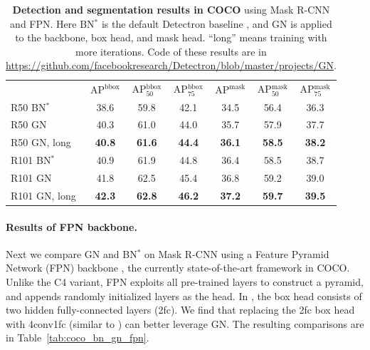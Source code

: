 \documentclass[10pt,twocolumn,letterpaper]{article}
\newcommand{\f}{$^\text{*}$\xspace}
\begin{document}
\renewcommand\arraystretch{1.15}
\setlength{\tabcolsep}{2pt}
\begin{table}[t]
\centering
\small
\begin{tabular}{l|ccc|ccc}
\hline
 \multicolumn{1}{c|}{} & AP$^\text{bbox}$ & AP$^\text{bbox}_\text{50}$ & AP$^\text{bbox}_\text{75}$ & AP$^\text{mask}$ & AP$^\text{mask}_\text{50}$ & AP$^\text{mask}_\text{75}$ \\
\shline
R50 BN\f & 38.6 & 59.8 & 42.1 & 34.5 & 56.4 & 36.3 \\
R50 GN & 40.3 & 61.0 & 44.0 & 35.7 & 57.9 & 37.7 \\
R50 GN, long & \textbf{40.8} & \textbf{61.6} & \textbf{44.4} & \textbf{36.1} & \textbf{58.5} & \textbf{38.2}  \\
\hline
R101 BN\f & 40.9 & 61.9 & 44.8 & 36.4 & 58.5 & 38.7 \\
R101 GN & 41.8 & 62.5 & 45.4 & 36.8 & 59.2 & 39.0 \\
R101 GN, long & \textbf{42.3} & \textbf{62.8} & \textbf{46.2} & \textbf{37.2} & \textbf{59.7} & \textbf{39.5} \\
\hline
\end{tabular}
\vspace{.5em}
\caption{\textbf{Detection and segmentation results in COCO} using Mask R-CNN and FPN. Here BN\f is the default Detectron baseline \cite{Detectron2018}, and GN is applied to the backbone, box head, and mask head. ``long'' means training with more iterations. Code of these results are in {\footnotesize \url{https://github.com/facebookresearch/Detectron/blob/master/projects/GN}}.
}\label{tab:coco_bn_gn_final}
\vspace{-.8em}
\end{table}

\paragraph{Results of FPN backbone.}
Next we compare GN and BN\f on Mask R-CNN using a Feature Pyramid Network (FPN) backbone \cite{Lin2017}, the currently state-of-the-art framework in COCO. Unlike the C4 variant, FPN exploits all pre-trained layers to construct a pyramid, and appends randomly initialized layers as the head. In \cite{Lin2017}, the box head consists of two hidden fully-connected layers (2fc). We find that replacing the 2fc box head with 4conv1fc (similar to \cite{Ren2017b}) can better leverage GN.
The resulting comparisons are in Table~\ref{tab:coco_bn_gn_fpn}.
\end{document}
